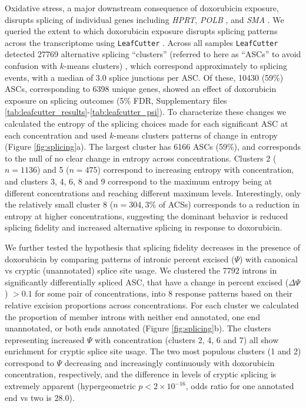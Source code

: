 \documentclass[9pt,lineno]{elife}
\begin{document}
Oxidative stress, a major downstream consequence of doxorubicin exposure, disrupts splicing of individual genes including \emph{HPRT}, \emph{POLB} \citep{Disher2007}, and \emph{SMA} \citep{Seo2016}. We queried the extent to which doxorubicin exposure disrupts splicing patterns across the transcriptome using \texttt{LeafCutter} \citep{LeafCutter}. Across all samples \texttt{LeafCutter} detected 27769 alternative splicing ``clusters'' (referred to here as ``ASCs'' to avoid confusion with $k$-means clusters) , which correspond approximately to splicing events, with a median of 3.0 splice junctions per ASC. Of these, 10430 (59\%) ASCs, corresponding to 6398 unique genes, showed an effect of doxorubicin exposure on splicing outcomes (5\% FDR, Supplementary files \ref{tab:leafcutter_results}-\ref{tab:leafcutter_psi}). To characterize these changes we calculated the entropy of the splicing choices made for each significant ASC at each concentration and used $k$-means clusters patterns of change in entropy (Figure \ref{fig:splicing}a). The largest cluster has 6166 ASCs (59\%), and corresponds to the null of no clear change in entropy across concentrations. Clusters 2 ($n=1136$) and 5 ($n=475$) correspond to increasing entropy with concentration, and clusters 3, 4, 6, 8 and 9 correspond to the maximum entropy being at different concentrations and reaching different maximum levels. Interestingly, only the relatively small cluster 8 ($n=304, 3\%$ of ACSs) corresponds to a reduction in entropy at higher  concentrations, suggesting the dominant behavior is reduced splicing fidelity and increased alternative splicing in response to doxorubicin. 

We further tested the hypothesis that splicing fidelity decreases in the presence of doxorubicin by comparing patterns of intronic percent excised ($\Psi$) with canonical vs cryptic (unannotated) splice site usage. We clustered the 7792 introns in significantly differentially spliced ASC, that have a change in percent excised ($\Delta \Psi$) $ > 0.1$ for some pair of concentrations, into 8 response patterns based on their relative excision proportions across concentrations. For each cluster we calculated the proportion of member introns with neither end annotated, one end unannotated, or both ends annotated (Figure \ref{fig:splicing}b). The clusters representing increased $\Psi$ with concentration (clusters 2, 4, 6 and 7) all show enrichment for cryptic splice site usage. The two most populous clusters (1 and 2) correspond to $\Psi$ decreasing and increasingly continuously with doxorubicin concentration, respectively, and the difference in levels of cryptic splicing is extremely apparent (hypergeometric $p < 2 \times 10^{-16}$, odds ratio for one annotated end vs two is $28.0$).
\end{document}
